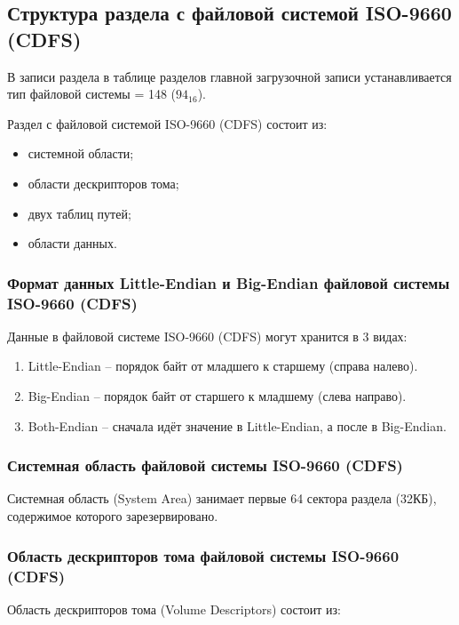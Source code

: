 \subsection{Структура раздела с файловой системой ISO-9660 (CDFS)}

В записи раздела в таблице разделов главной загрузочной записи устанавливается тип файловой системы = 148 ($94_{16}$).

Раздел с файловой системой ISO-9660 (CDFS) состоит из:

\begin{itemize}
\item системной области;
\item области дескрипторов тома;
\item двух таблиц путей;
\item области данных.
\end{itemize}

\subsubsection{Формат данных Little-Endian и Big-Endian файловой системы ISO-9660 (CDFS)}

Данные в файловой системе ISO-9660 (CDFS) могут хранится в 3 видах:

\begin{enumerate}
\item Little-Endian -- порядок байт от младшего к старшему (справа налево).
\item Big-Endian -- порядок байт от старшего к младшему (слева направо).
\item Both-Endian -- сначала идёт значение в Little-Endian, а после в Big-Endian.
\end{enumerate}

\subsubsection{Системная область файловой системы ISO-9660 (CDFS)}

Системная область (System Area) занимает первые 64 сектора раздела (32КБ), содержимое которого зарезервировано.

\subsubsection{Область дескрипторов тома файловой системы ISO-9660 (CDFS)}

Область дескрипторов тома (Volume Descriptors) состоит из:

